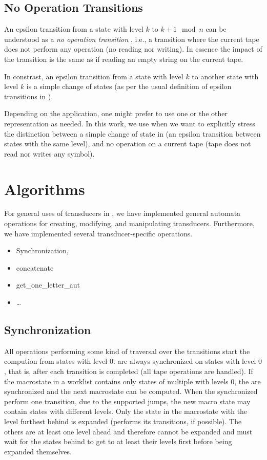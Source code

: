 \subsection{No Operation Transitions}
An epsilon transition from a state with level $k$ to $k+1 \mod n$ can be understood as a \emph{no operation transition} \nop, i.e., a transition where the current tape does not perform any operation (no reading nor writing). In essence the impact of the transition is the same as if reading an empty string on the current tape.

In constrast, an epsilon transition from a state with level $k$ to another state with level $k$ is a simple change of states (as per the usual definition of epsilon transitions in \nfas).

Depending on the application, one might prefer to use one or the other representation as needed.
In this work, we use \nop when we want to explicitly stress the distinction between a simple change of state in \nft (an epsilon transition between states with the same level), and no operation on a current tape (tape does not read nor writes any symbol).

\section{Algorithms}
\label{sec:Algorithms}

For general uses of transducers in \mata, we have implemented general automata operations for creating, modifying, and manipulating transducers.
Furthermore, we have implemented several transducer-specific operations.

\begin{itemize}
  \item Synchronization,
  \item concatenate
  \item get\_one\_letter\_aut
  \item \ldots
\end{itemize}

\subsection{Synchronization}

All operations performing some kind of traversal over the transitions start the compution from states with level $0$.
\nfts are always synchronized on states with level $0$, that is, after each \nft transition is completed (all tape operations are handled).
If the macrostate in a worklist contains only states of multiple \nfts with levels $0$, the \nfts are synchronized and the next macrostate can be computed.
When the synchronized \nfts perform one transition, due to the supported jumps, the new macro state may contain states with different levels.
Only the state in the macrostate with the level furthest behind is expanded (performs its transitions, if possible).
The others are at least one level ahead and therefore cannot be expanded and must wait for the states behind to get to at least their levels first before being expanded themselves.

